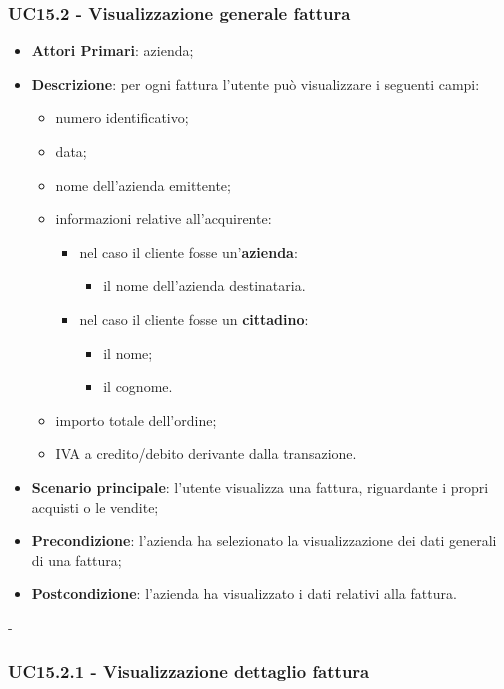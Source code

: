 \subsubsection{UC15.2 - Visualizzazione generale fattura}
\begin{itemize}
	\item \textbf{Attori Primari}: azienda;
	\item \textbf{Descrizione}: per ogni fattura l'utente può visualizzare i seguenti campi:
	\begin{itemize}
		\item numero identificativo;
		\item data;
		\item nome dell'azienda emittente;
		\item informazioni relative all'acquirente:
		\begin{itemize}
			\item nel caso il cliente fosse un'\textbf{azienda}:
			\begin{itemize}
				\item il nome dell'azienda destinataria.
			\end{itemize}
			\item nel caso il cliente fosse un \textbf{cittadino}:
			\begin{itemize}
				\item il nome;
				\item il cognome.
			\end{itemize}
		\end{itemize}
		\item importo totale dell'ordine;
		\item IVA a credito/debito derivante dalla transazione.
	\end{itemize}
	\item \textbf{Scenario principale}: l'utente visualizza una fattura, riguardante i propri  acquisti o le vendite;
	\item \textbf{Precondizione}: l'azienda ha selezionato la visualizzazione dei dati generali di una fattura;
	\item \textbf{Postcondizione}: l'azienda ha visualizzato i dati relativi alla fattura.
\end{itemize}
-\subsubsection{UC15.2.1 - Visualizzazione dettaglio fattura}
